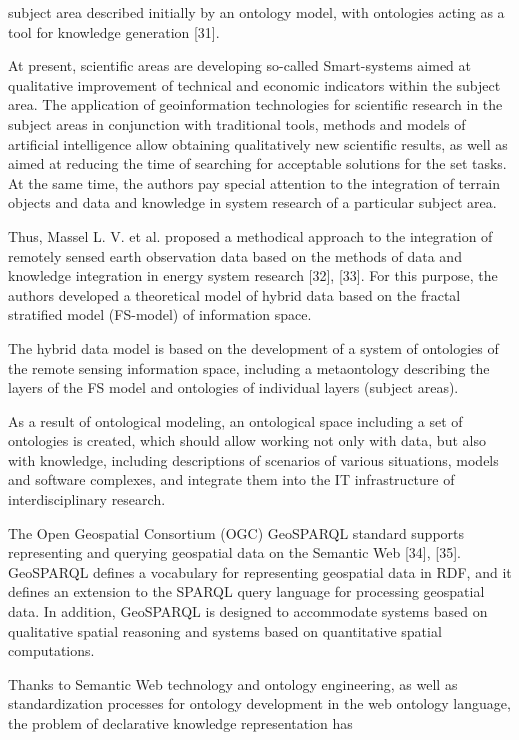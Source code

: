\documentclass[a4paper]{article}
\begin{document}
\begin{multicols}{2}
{ subject area described initially by an ontology model, with ontologies acting as a tool for knowledge generation
[31]. \par
{At present, scientific areas are developing so-called
Smart-systems aimed at qualitative improvement of technical and economic indicators within the subject area.
The application of geoinformation technologies for scientific research in the subject areas in conjunction with
traditional tools, methods and models of artificial intelligence allow obtaining qualitatively new scientific results,
as well as aimed at reducing the time of searching
for acceptable solutions for the set tasks. At the same
time, the authors pay special attention to the integration
of terrain objects and data and knowledge in system
research of a particular subject area.\par
Thus, Massel L. V. et al. proposed a methodical
approach to the integration of remotely sensed earth
observation data based on the methods of data and
knowledge integration in energy system research [32],
[33]. For this purpose, the authors developed a theoretical
model of hybrid data based on the fractal stratified model
(FS-model) of information space.\par
The hybrid data model is based on the development of
a system of ontologies of the remote sensing information
space, including a metaontology describing the layers of
the FS model and ontologies of individual layers (subject
areas).\par
As a result of ontological modeling, an ontological
space including a set of ontologies is created, which
should allow working not only with data, but also with
knowledge, including descriptions of scenarios of various
situations, models and software complexes, and integrate
them into the IT infrastructure of interdisciplinary research.\par
The Open Geospatial Consortium (OGC)
GeoSPARQL standard supports representing and
querying geospatial data on the Semantic Web [34],
[35]. GeoSPARQL defines a vocabulary for representing
geospatial data in RDF, and it defines an extension to the
SPARQL query language for processing geospatial data.
In addition, GeoSPARQL is designed to accommodate
systems based on qualitative spatial reasoning and
systems based on quantitative spatial computations.\par
Thanks to Semantic Web technology and ontology
engineering, as well as standardization processes for
ontology development in the web ontology language,
the problem of declarative knowledge representation has
}}
\end{multicols}
\end{document}
